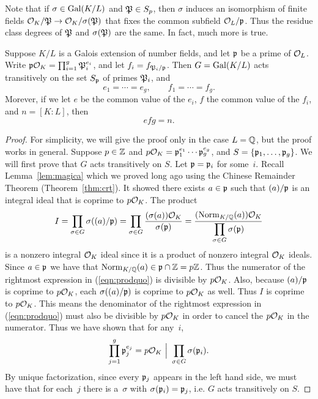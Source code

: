 Note that if $\sigma\in\Gal(K/L)$ and $\P\in S_p$, then $\sigma$
induces an isomorphism of finite fields $\O_K/\P\to \O_K/\sigma(\P)$
that fixes the common subfield $\O_L/\p$.  Thus the residue class
degrees of $\P$ and $\sigma(\P)$ are the same.  In fact, much more is
true.
\begin{theorem}\label{thm:transitive}
Suppose $K/L$ is a Galois extension of number fields,
and let $\p$ be a prime of $\O_L$.  Write
$\p\O_K=\prod_{i=1}^g \P_i^{e_i}$, and let $f_i = f_{\P_i/\p}$.
Then
$G=\Gal(K/L)$ acts transitively on the set
$S_\p$ of primes $\P_i$, and
$$
  e_1=\cdots =e_g, \qquad f_1 =\cdots = f_g.
$$
Morever, if we let $e$ be the common value of the $e_i$,
$f$ the common value of the $f_i$, and $n=[K:L]$, then
$$
   efg=n.
$$
\end{theorem}
\begin{proof}
For simplicity, we will give the proof only in the case $L=\Q$, but
the proof works in general.  Suppose $p\in\Z$ and
$p\O_K=\p_1^{e_1}\cdots \p_g^{e_g}$, and $S=\{\p_1,\ldots, \p_g\}$.  We
will first prove that $G$ acts transitively on $S$.  Let $\p=\p_i$ for
some~$i$.   Recall Lemma~\ref{lem:magica} which we proved long ago using the
Chinese Remainder Theorem (Theorem~\ref{thm:crt}). It showed there exists
$a\in\p$ such that $(a)/\p$ is an integral ideal that is
coprime to $p\O_K$.   The product
\begin{equation}\label{eqn:prodquo}
 I= \prod_{\sigma\in G} \sigma((a)/\p)
   = \prod_{\sigma\in G} \frac{(\sigma(a))\O_K}{\sigma(\p)}
    = \frac{(\Norm_{K/\Q}(a))\O_K}{\displaystyle \prod_{\sigma\in G} \sigma(\p)}
\end{equation}
is a nonzero integral $\O_K$ ideal since it is a product of nonzero
integral $\O_K$ ideals.
Since $a\in \p$ we have that
$\Norm_{K/\Q}(a) \in \p\cap\Z=p\Z$.  Thus the numerator of
the rightmost expression in (\ref{eqn:prodquo}) is
divisible by $p\O_K$.   Also, because $(a)/\p$ is coprime
to $p\O_K$, each $\sigma((a)/\p)$ is coprime to $p\O_K$
as well.   Thus $I$ is coprime to $p\O_K$.   This means the
denominator of the rightmost expression in (\ref{eqn:prodquo})
must also be divisible by $p\O_K$ in order to cancel the $p\O_K$
in the numerator.  Thus we have shown that for any~$i$,
$$
  \prod_{j=1}^g \p_j^{e_j} = p\O_K \,\,\Big|\,\, \prod_{\sigma\in G} \sigma(\p_i).
$$
By unique factorization, since every $\p_j$ appears in the left hand
side, we must have that for each~$j$ there is a~$\sigma$ with
$\sigma(\p_i)=\p_j$, i.e. $G$ acts transitively on $S$.


\end{proof}
